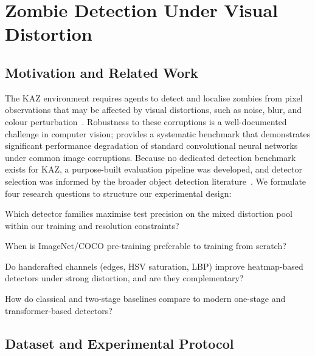 \documentclass[11pt,a4paper]{article}
\begin{document}
\section{Zombie Detection Under Visual Distortion}
\label{sec:task3}

\subsection{Motivation and Related Work}
\label{sec:task3_intro}

The KAZ environment requires agents to detect and localise zombies from pixel observations that may be affected by visual distortions, such as noise, blur, and colour perturbation~\citep{mlproject2026}. Robustness to these corruptions is a well-documented challenge in computer vision; \citet{hendrycks2019benchmarking} provides a systematic benchmark that demonstrates significant performance degradation of standard convolutional neural networks under common image corruptions. Because no dedicated detection benchmark exists for KAZ, a purpose-built evaluation pipeline was developed, and detector selection was informed by the broader object detection literature~\citep{liu2020deep,ren2015fasterrcnn,zhao2024rtdetr}.
\newline
\noindent We formulate four research questions to structure our experimental design:
\begin{description}[style=nextline,font=\normalfont\bfseries,noitemsep]
  \item[RQ1 (Detector family)] Which detector families maximise test precision on the mixed distortion pool within our training and resolution constraints?
  \item[RQ2 (Transfer vs.\ scratch)] When is ImageNet/COCO pre-training preferable to training from scratch?
  \item[RQ3 (Handcrafted features)] Do handcrafted channels (edges, HSV saturation, LBP) improve heatmap-based detectors under strong distortion, and are they complementary?
  \item[RQ4 (Baseline comparison)] How do classical and two-stage baselines compare to modern one-stage and transformer-based detectors?
\end{description}

\subsection{Dataset and Experimental Protocol}
\label{sec:dataset}
\end{document}
